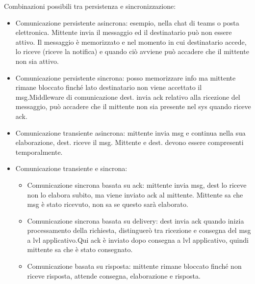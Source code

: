 \documentclass{article}
\begin{document}
Combinazioni possibili tra persistenza e sincronizzazione:\\
\begin{itemize}
\item Comunicazione persistente asincrona:
esempio, nella chat di teams o posta elettronica. Mittente invia il messaggio ed il destinatario può non essere attivo. Il messaggio è memorizzato e nel momento in cui destinatario accede, lo riceve (riceve la notifica) e quando ciò avviene può accadere che il mittente non sia attivo.
\item Comunicazione persistente sincrona: posso memorizzare info ma mittente rimane bloccato finché lato destinatario non viene accettato il msg.Middleware di comunicazione dest. invia ack relativo alla ricezione del messaggio, può accadere che il mittente non sia presente nel sys quando riceve ack.
\item Comunicazione transiente asincrona: mittente invia msg e continua nella sua elaborazione, dest. riceve il msg. Mittente e dest. devono essere compresenti temporalmente.
\item Comunicazione transiente e sincrona:
\begin{itemize}
\item Comunicazione sincrona basata su ack: mittente invia msg, dest lo riceve non lo elabora subito, ma viene inviato ack al mittente. Mittente sa che msg è stato ricevuto, non sa se questo sarà elaborato.
\item Comunicazione sincrona basata su delivery: dest invia ack quando inizia processamento della richiesta, distinguerò tra ricezione e consegna del msg a lvl applicativo.Qui ack è inviato dopo consegna a lvl applicativo, quindi mittente sa che è stato consegnato.
\item Comunicazione basata su risposta: mittente rimane bloccato finché non riceve risposta, attende consegna, elaborazione e risposta.
\end{itemize}
\end{itemize}
\end{document}

